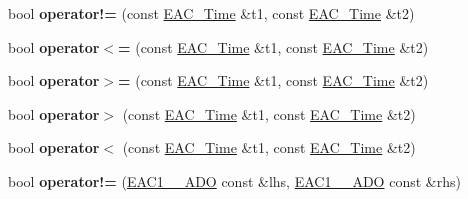 \begin{DoxyCompactItemize}
\item 
\hypertarget{namespaceBotan_ad80f26b1699e308f0b1fcaf13e849abe}{bool {\bfseries operator!=} (const \hyperlink{classBotan_1_1EAC__Time}{E\-A\-C\-\_\-\-Time} \&t1, const \hyperlink{classBotan_1_1EAC__Time}{E\-A\-C\-\_\-\-Time} \&t2)}\label{namespaceBotan_ad80f26b1699e308f0b1fcaf13e849abe}

\item 
\hypertarget{namespaceBotan_a493f6c4a3e27aa5adf11557ca0c82ce9}{bool {\bfseries operator$<$=} (const \hyperlink{classBotan_1_1EAC__Time}{E\-A\-C\-\_\-\-Time} \&t1, const \hyperlink{classBotan_1_1EAC__Time}{E\-A\-C\-\_\-\-Time} \&t2)}\label{namespaceBotan_a493f6c4a3e27aa5adf11557ca0c82ce9}

\item 
\hypertarget{namespaceBotan_ab8a5b9e3411ad14fe601a5cbd8195484}{bool {\bfseries operator$>$=} (const \hyperlink{classBotan_1_1EAC__Time}{E\-A\-C\-\_\-\-Time} \&t1, const \hyperlink{classBotan_1_1EAC__Time}{E\-A\-C\-\_\-\-Time} \&t2)}\label{namespaceBotan_ab8a5b9e3411ad14fe601a5cbd8195484}

\item 
\hypertarget{namespaceBotan_ac3401d15a8655d86ec66d25ef7d278dc}{bool {\bfseries operator$>$} (const \hyperlink{classBotan_1_1EAC__Time}{E\-A\-C\-\_\-\-Time} \&t1, const \hyperlink{classBotan_1_1EAC__Time}{E\-A\-C\-\_\-\-Time} \&t2)}\label{namespaceBotan_ac3401d15a8655d86ec66d25ef7d278dc}

\item 
\hypertarget{namespaceBotan_a2645f9b511927b61ddc4734dcf463ee8}{bool {\bfseries operator$<$} (const \hyperlink{classBotan_1_1EAC__Time}{E\-A\-C\-\_\-\-Time} \&t1, const \hyperlink{classBotan_1_1EAC__Time}{E\-A\-C\-\_\-\-Time} \&t2)}\label{namespaceBotan_a2645f9b511927b61ddc4734dcf463ee8}

\item 
\hypertarget{namespaceBotan_a15942ebe49d5d963fd46844c12c7b98a}{bool {\bfseries operator!=} (\hyperlink{classBotan_1_1EAC1__1__ADO}{E\-A\-C1\-\_\-\_\-\-A\-D\-O} const \&lhs, \hyperlink{classBotan_1_1EAC1__1__ADO}{E\-A\-C1\-\_\-\_\-\-A\-D\-O} const \&rhs)}\label{namespaceBotan_a15942ebe49d5d963fd46844c12c7b98a}


\end{DoxyCompactItemize}
